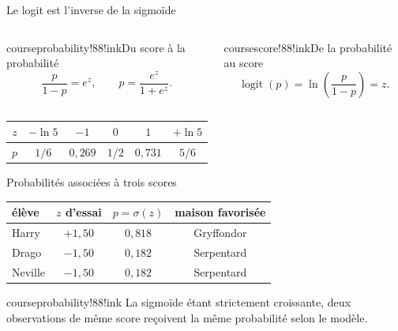 \begin{frame}[t]{Le logit est l'inverse de la sigmoïde}
  \vspace{5mm}
  \begin{columns}[T,onlytextwidth]
      \begin{coursecallout}{courseprobability!88!ink}{Du score à la probabilité}
        \[
          \frac{p}{1-p}=e^z,
          \qquad p=\frac{e^z}{1+e^z}.
        \]
      \end{coursecallout}
      \begin{coursecallout}{coursescore!88!ink}{De la probabilité au score}
        \[
          \operatorname{logit}(p)
          =\ln\!\left(\frac{p}{1-p}\right)=z.
        \]
      \end{coursecallout}
  \end{columns}
  \vfill
  \centering
  \begin{tabular}{c|ccccc}
    $z$ & $-\ln5$ & $-1$ & $0$ & $1$ & $+\ln5$\\
    \midrule
    $p$ & $1/6$ & $0{,}269$ & $1/2$ & $0{,}731$ & $5/6$
  \end{tabular}
\end{frame}

\begin{frame}[t]{Probabilités associées à trois scores}
  \centering
  \renewcommand{\arraystretch}{1.35}
  \begin{tabular}{lccc}
    \toprule
    élève & $z$ d'essai & $p=\sigma(z)$ & maison favorisée\\
    \midrule
    Harry   & $+1{,}50$ & $0{,}818$ & Gryffondor\\
    Drago   & $-1{,}50$ & $0{,}182$ & Serpentard\\
    Neville & $-1{,}50$ & $0{,}182$ & Serpentard\\
    \bottomrule
  \end{tabular}
  \vfill
  \begin{coursecallout}{courseprobability!88!ink}{}
    La sigmoïde étant strictement croissante, deux observations de même score
    reçoivent la même probabilité selon le modèle.
  \end{coursecallout}
\end{frame}


